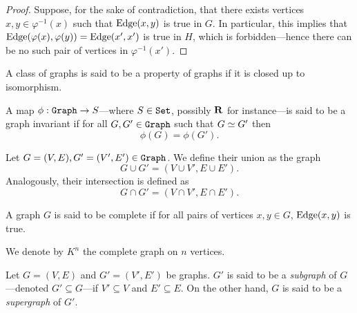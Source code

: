 \begin{proof}
    Suppose, for the sake of contradiction, that there exists vertices \(x, y \in
    \varphi^{-1}(x)\) such that \(\operatorname{Edge}(x, y)\) is true in \(G\). In particular, this
    implies that \(\operatorname{Edge}(\varphi(x), \varphi(y)) = \operatorname{Edge}(x', x')\) is true in \(H\), which
    is forbidden---hence there can be no such pair of vertices in
    \(\varphi^{-1}(x')\).
\end{proof}

\begin{definition}\label{def: graph-property}
    A class of graphs is said to be a property of graphs if it is closed up to
    isomorphism.
\end{definition}

\begin{definition}\label{def: graph-invariant}
    A map \(\phi: {\texttt{Graph}} \to S\)---where \(S \in {\texttt{Set}}\), possibly \(\mathbf{R}\) for
    instance---is said to be a graph invariant if for all \(G, G' \in
    {\texttt{Graph}}\) such that \(G \simeq G'\) then
    \[
        \phi(G) = \phi(G').
    \]
\end{definition}

\begin{definition}\label{def: union-intersection-gph}
    Let \(G = (V, E), G' = (V', E') \in {\texttt{Graph}}\). We define their union as the
    graph
    \[
        G \cup G' = (V \cup V', E \cup E').
    \]
    Analogously, their intersection is defined as
    \[
        G \cap G' = (V \cap V', E \cap E').
    \]
\end{definition}

\begin{definition}\label{def: complete-graph}
    A graph \(G\) is said to be complete if for all pairs of vertices \(x, y \in
    G\), \(\operatorname{Edge}(x, y)\) is true.
\end{definition}

\begin{notation}
    We denote by \(K^n\) the complete graph on \(n\) vertices.
\end{notation}

\begin{definition}[Subgraph]
    Let \(G = (V, E)\) and \(G' = (V', E')\) be graphs. \(G'\) is said to be a
    \emph{subgraph} of \(G\)---denoted \(G' \subseteq G\)---if \(V' \subseteq
    V\) and \(E' \subseteq E\). On the other hand, \(G\) is said to be a
    \emph{supergraph} of \(G'\).
\end{definition}

